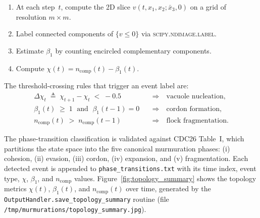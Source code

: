 \begin{enumerate}
  \item At each step~$t$, compute the 2D slice $v(t, x_1, x_2;\bar{x}_3, 0)$
        on a grid of resolution $m \times m$.
  \item Label connected components of $\{v \leq 0\}$ via
        \textsc{scipy.ndimage.label}.
  \item Estimate $\beta_1$ by counting encircled complementary components.
  \item Compute $\chi(t) = n_{\mathrm{comp}}(t) - \beta_1(t)$.
\end{enumerate}

The threshold-crossing rules that trigger an event label are:
%
\begin{align}
\label{eq:vacuole_marker}
\Delta\chi_t \;\triangleq\; \chi_{t+1} - \chi_t \;<\; -0.5
&\quad\Longrightarrow\quad \text{vacuole nucleation,} \\
\label{eq:cordon_marker}
\beta_1(t) \;\geq\; 1 \;\text{ and }\; \beta_1(t-1) = 0
&\quad\Longrightarrow\quad \text{cordon formation,} \\
\label{eq:frag_marker}
n_{\mathrm{comp}}(t) \;>\; n_{\mathrm{comp}}(t-1)
&\quad\Longrightarrow\quad \text{flock fragmentation.}
\end{align}

The phase-transition classification is validated against CDC26 Table~I, which
partitions the state space into the five canonical murmuration phases: (i)
cohesion, (ii) evasion, (iii) cordon, (iv) expansion, and (v) fragmentation.
Each detected event is appended to \texttt{phase\_transitions.txt} with its
time index, event type, $\chi$, $\beta_1$, and $n_{\mathrm{comp}}$ values.
Figure~\ref{fig:topology_summary} shows the topology metrics $\chi(t)$,
$\beta_1(t)$, and $n_{\mathrm{comp}}(t)$ over time, generated by the
\texttt{OutputHandler.save\_topology\_summary} routine (file
\texttt{/tmp/murmurations/topology\_summary.jpg}).
